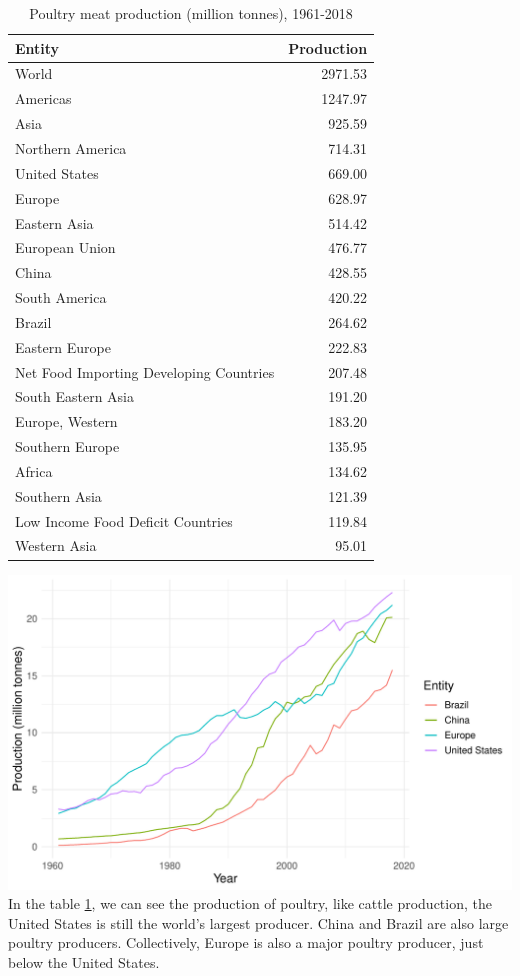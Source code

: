 \documentclass[11pt,a4paper,]{article}
\begin{document}
\clearpage

\begin{table}

\caption{\label{tab:poultry}Poultry meat production (million tonnes), 1961-2018}
\centering
\begin{tabular}[t]{lr}
\toprule
Entity & Production\\
\midrule
World & 2971.53\\
Americas & 1247.97\\
Asia & 925.59\\
Northern America & 714.31\\
United States & 669.00\\
\addlinespace
Europe & 628.97\\
Eastern Asia & 514.42\\
European Union & 476.77\\
China & 428.55\\
South America & 420.22\\
\addlinespace
Brazil & 264.62\\
Eastern Europe & 222.83\\
Net Food Importing Developing Countries & 207.48\\
South Eastern Asia & 191.20\\
Europe, Western & 183.20\\
\addlinespace
Southern Europe & 135.95\\
Africa & 134.62\\
Southern Asia & 121.39\\
Low Income Food Deficit Countries & 119.84\\
Western Asia & 95.01\\
\bottomrule
\end{tabular}
\end{table}

\includegraphics{report_files/figure-latex/poultry-1.pdf}
In the table \ref{tab:poultry}, we can see the production of poultry, like cattle production, the United States is still the world's largest producer. China and Brazil are also large poultry producers. Collectively, Europe is also a major poultry producer, just below the United States.
\end{document}
